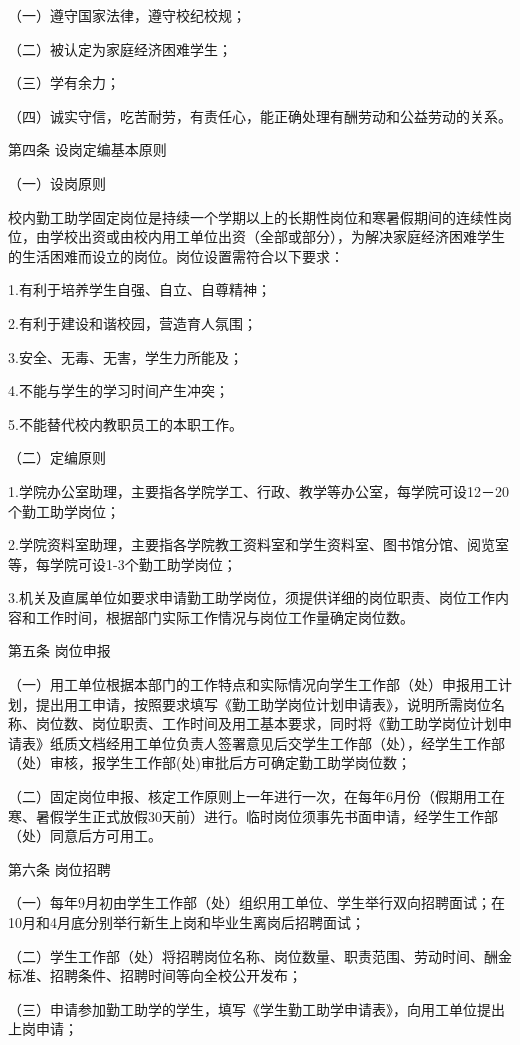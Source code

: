 \documentclass[UTF8,12pt,a4paper]{report}
\begin{document}
（一）遵守国家法律，遵守校纪校规；

（二）被认定为家庭经济困难学生；

（三）学有余力；

（四）诚实守信，吃苦耐劳，有责任心，能正确处理有酬劳动和公益劳动的关系。

第四条 设岗定编基本原则

（一）设岗原则

校内勤工助学固定岗位是持续一个学期以上的长期性岗位和寒暑假期间的连续性岗位，由学校出资或由校内用工单位出资（全部或部分），为解决家庭经济困难学生的生活困难而设立的岗位。岗位设置需符合以下要求：

1.有利于培养学生自强、自立、自尊精神；

2.有利于建设和谐校园，营造育人氛围；

3.安全、无毒、无害，学生力所能及；

4.不能与学生的学习时间产生冲突；

5.不能替代校内教职员工的本职工作。

（二）定编原则

1.学院办公室助理，主要指各学院学工、行政、教学等办公室，每学院可设12－20个勤工助学岗位；

2.学院资料室助理，主要指各学院教工资料室和学生资料室、图书馆分馆、阅览室等，每学院可设1-3个勤工助学岗位；

3.机关及直属单位如要求申请勤工助学岗位，须提供详细的岗位职责、岗位工作内容和工作时间，根据部门实际工作情况与岗位工作量确定岗位数。

第五条 岗位申报

（一）用工单位根据本部门的工作特点和实际情况向学生工作部（处）申报用工计划，提出用工申请，按照要求填写《勤工助学岗位计划申请表》，说明所需岗位名称、岗位数、岗位职责、工作时间及用工基本要求，同时将《勤工助学岗位计划申请表》纸质文档经用工单位负责人签署意见后交学生工作部（处），经学生工作部（处）审核，报学生工作部(处)审批后方可确定勤工助学岗位数；

（二）固定岗位申报、核定工作原则上一年进行一次，在每年6月份（假期用工在寒、暑假学生正式放假30天前）进行。临时岗位须事先书面申请，经学生工作部（处）同意后方可用工。

第六条 岗位招聘

（一）每年9月初由学生工作部（处）组织用工单位、学生举行双向招聘面试；在10月和4月底分别举行新生上岗和毕业生离岗后招聘面试；

（二）学生工作部（处）将招聘岗位名称、岗位数量、职责范围、劳动时间、酬金标准、招聘条件、招聘时间等向全校公开发布；

（三）申请参加勤工助学的学生，填写《学生勤工助学申请表》，向用工单位提出上岗申请；
\end{document}
